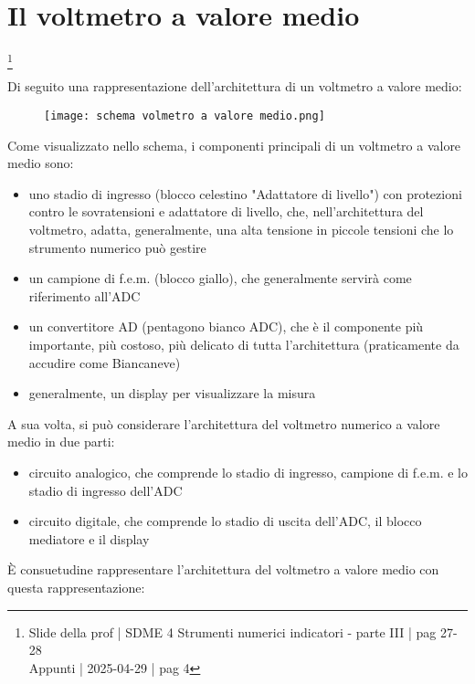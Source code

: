 \newpage 

\section{Il voltmetro a valore medio}
\footnote{Slide della prof | SDME 4 Strumenti numerici indicatori - parte III | pag  27-28 \\  
Appunti | 2025-04-29 | pag 4} 

Di seguito una rappresentazione dell'architettura di un voltmetro a valore medio: 

\begin{figure}[h]
    \centering
    \texttt{[image: schema volmetro a valore medio.png]}
\end{figure} 

Come visualizzato nello schema, i componenti principali di un voltmetro a valore medio sono: 

\begin{itemize}
    \item uno stadio di ingresso (blocco celestino "Adattatore di livello") con protezioni contro le sovratensioni e adattatore di livello, che, nell'architettura del voltmetro, adatta, generalmente, una alta tensione in piccole tensioni che lo strumento numerico può gestire
    \item un campione di f.e.m. (blocco giallo), che generalmente servirà come riferimento all'ADC 
    \item un convertitore AD (pentagono bianco ADC), che è il componente più importante, più costoso, più delicato di tutta l'architettura (praticamente da accudire come Biancaneve) 
    \item generalmente, un display per visualizzare la misura 
\end{itemize}

A sua volta, si può considerare l'architettura del voltmetro numerico a valore medio in due parti: 

\begin{itemize}
    \item circuito analogico, che comprende lo stadio di ingresso, campione di f.e.m. e lo stadio di ingresso dell'ADC 
    \item circuito digitale, che comprende lo stadio di uscita dell'ADC, il blocco mediatore e il display
\end{itemize}

È consuetudine rappresentare l'architettura del voltmetro a valore medio con questa rappresentazione: 

